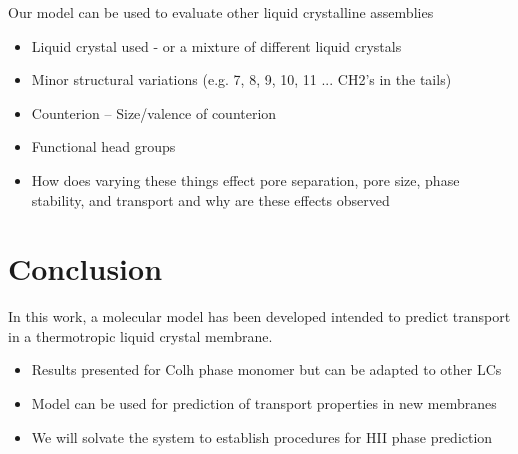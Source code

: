 \documentclass{article}
\begin{document}
	Our model can be used to evaluate other liquid crystalline assemblies
		\begin{itemize}
			\item Liquid crystal used - or a mixture of different liquid crystals
			\item Minor structural variations (e.g. 7, 8, 9, 10, 11 ... CH2's in the tails)
			\item Counterion -- Size/valence of counterion
			\item Functional head groups
			\item How does varying these things effect pore separation, pore size, phase stability, and transport and why are these effects observed
		\end{itemize} 
		
	\section{Conclusion}

	In this work, a molecular model has been developed intended to predict transport in a thermotropic liquid crystal membrane. 
	\begin{itemize}
		\item Results presented for Colh phase monomer but can be adapted to other LCs
		\item Model can be used for prediction of transport properties in new membranes
		\item We will solvate the system to establish procedures for HII phase prediction
	\end{itemize}
	
	
\end{document}
